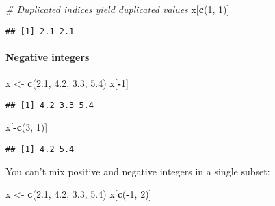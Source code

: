 \documentclass[
]{book}
\newenvironment{Shaded}{\begin{snugshade}}{\end{snugshade}}
\newcommand{\CommentTok}[1]{\textcolor[rgb]{0.56,0.35,0.01}{\textit{#1}}}
\newcommand{\DecValTok}[1]{\textcolor[rgb]{0.00,0.00,0.81}{#1}}
\newcommand{\FloatTok}[1]{\textcolor[rgb]{0.00,0.00,0.81}{#1}}
\newcommand{\KeywordTok}[1]{\textcolor[rgb]{0.13,0.29,0.53}{\textbf{#1}}}
\newcommand{\NormalTok}[1]{#1}
\newcommand{\OperatorTok}[1]{\textcolor[rgb]{0.81,0.36,0.00}{\textbf{#1}}}
\newcommand{\StringTok}[1]{\textcolor[rgb]{0.31,0.60,0.02}{#1}}
\begin{document}
\begin{Shaded}
\begin{Highlighting}[]
\CommentTok{\# Duplicated indices yield duplicated values}
\NormalTok{x[}\KeywordTok{c}\NormalTok{(}\DecValTok{1}\NormalTok{, }\DecValTok{1}\NormalTok{)]}
\end{Highlighting}
\end{Shaded}

\begin{verbatim}
## [1] 2.1 2.1
\end{verbatim}

\hypertarget{negative-integers}{%
\paragraph{Negative integers}\label{negative-integers}}

\begin{Shaded}
\begin{Highlighting}[]
\NormalTok{x \textless{}{-}}\StringTok{ }\KeywordTok{c}\NormalTok{(}\FloatTok{2.1}\NormalTok{, }\FloatTok{4.2}\NormalTok{, }\FloatTok{3.3}\NormalTok{, }\FloatTok{5.4}\NormalTok{)}
\NormalTok{x[}\OperatorTok{{-}}\DecValTok{1}\NormalTok{]}
\end{Highlighting}
\end{Shaded}

\begin{verbatim}
## [1] 4.2 3.3 5.4
\end{verbatim}

\begin{Shaded}
\begin{Highlighting}[]
\NormalTok{x[}\OperatorTok{{-}}\KeywordTok{c}\NormalTok{(}\DecValTok{3}\NormalTok{, }\DecValTok{1}\NormalTok{)]}
\end{Highlighting}
\end{Shaded}

\begin{verbatim}
## [1] 4.2 5.4
\end{verbatim}

You can't mix positive and negative integers in a single subset:

\begin{Shaded}
\begin{Highlighting}[]
\NormalTok{x \textless{}{-}}\StringTok{ }\KeywordTok{c}\NormalTok{(}\FloatTok{2.1}\NormalTok{, }\FloatTok{4.2}\NormalTok{, }\FloatTok{3.3}\NormalTok{, }\FloatTok{5.4}\NormalTok{)}
\NormalTok{x[}\KeywordTok{c}\NormalTok{(}\OperatorTok{{-}}\DecValTok{1}\NormalTok{, }\DecValTok{2}\NormalTok{)]}
\end{Highlighting}
\end{Shaded}
\end{document}
